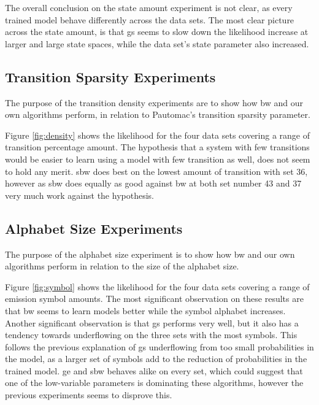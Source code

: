 The overall conclusion on the state amount experiment is not clear, as every trained model behave differently across the data sets. The most clear picture across the state amount, is that \gls{gs} seems to slow down the likelihood increase at larger and large state spaces, while the data set's state parameter also increased.\\
	
\FloatBarrier

\subsection{Transition Sparsity Experiments}

The purpose of the transition density experiments are to show how \gls{bw} and our own algorithms perform, in relation to Pautomac's transition sparsity parameter.

Figure \ref{fig:density} shows the likelihood for the four data sets covering a range of transition percentage amount. The hypothesis that a system with few transitions would be easier to learn using a model with few transition as well, does not seem to hold any merit. \gls{sbw} does best on the lowest amount of transition with set 36, however as \gls{sbw} does equally as good against \gls{bw} at both set number 43 and 37 very much work against the hypothesis.\\ 
	
	\FloatBarrier

\subsection{Alphabet Size Experiments}
The purpose of the alphabet size experiment is to show how \gls{bw} and our own algorithms perform in relation to the size of the alphabet size.

Figure \ref{fig:symbol} shows the likelihood for the four data sets covering a range of emission symbol amounts. The most significant observation on these results are that \gls{bw} seems to learn models better while the symbol alphabet increases. Another significant observation is that \gls{gs} performs very well, but it also has a tendency towards underflowing on the three sets with the most symbols. This follows the previous explanation of \gls{gs} underflowing from too small probabilities in the model, as a larger set of symbols add to the reduction of probabilities in the trained model.
\gls{ge} and \gls{sbw} behaves alike on every set, which could suggest that one of the low-variable parameters is dominating these algorithms, however the previous experiments seems to disprove this. \\
	
\FloatBarrier
	
